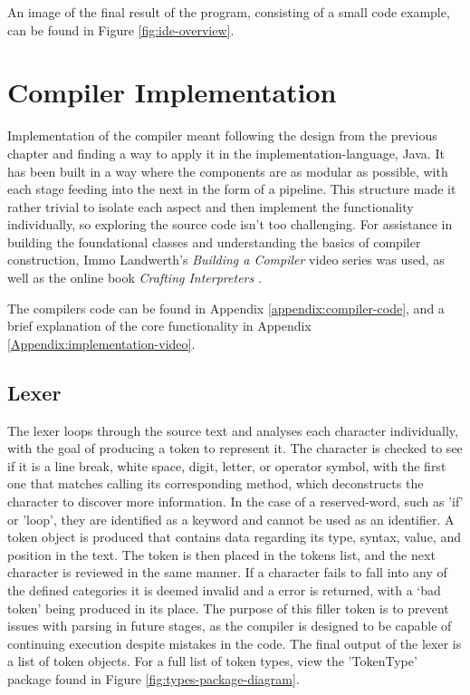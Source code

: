 \documentclass[
]{report}
\begin{document}
An image of the final result of the program, consisting of a small code example, can
be found in Figure \ref{fig:ide-overview}.

\section{Compiler Implementation}
Implementation of the compiler meant following the design from the
previous chapter and finding a way to apply it in the \gls{implementation-language}, Java.
It has been built in a way where the components are as modular as possible, with
each stage feeding into the next in the form of a pipeline. This
structure made it rather trivial to isolate each aspect and then
implement the functionality individually, so exploring the source code
isn't too challenging. For assistance in building the foundational classes
and understanding the basics of compiler construction, Immo Landwerth's \emph{Building
a Compiler} video series \cite{compiler-video} was used, as well as the online
book \emph{Crafting Interpreters} \cite{crafting-interpreters}.

The compilers code can be found in Appendix \ref{appendix:compiler-code}, and a brief
explanation of the core functionality in Appendix \ref{Appendix:implementation-video}.

\subsection{Lexer}
The lexer loops through the source text and analyses each character
individually, with the goal of producing a \gls{token} to represent it. The
character is checked to see if it is a line break, white space, digit,
letter, or operator \gls{symbol}, with the first one that matches calling its
corresponding method, which deconstructs the character to discover more
information. In the case of a \gls{reserved-word}, such as 'if' or 'loop',
they are identified as a \gls{keyword} and cannot be used as an \gls{identifier}.
A \gls{token} object is produced that contains data regarding its
type, syntax, value, and position in the text. The \gls{token} is then placed
in the \glspl{token} list, and the next character is reviewed in the same
manner. If a character fails to fall into any of the defined categories
it is deemed invalid and a error is returned, with a `bad \gls{token}' being
produced in its place. The purpose of this filler \gls{token} is to prevent
issues with \gls{parsing} in future stages, as the compiler is designed to be
capable of continuing execution despite mistakes in the code. The final
output of the lexer is a list of \gls{token} objects. For a full list of token types,
view the 'TokenType' package found in Figure \ref{fig:types-package-diagram}.
\end{document}
